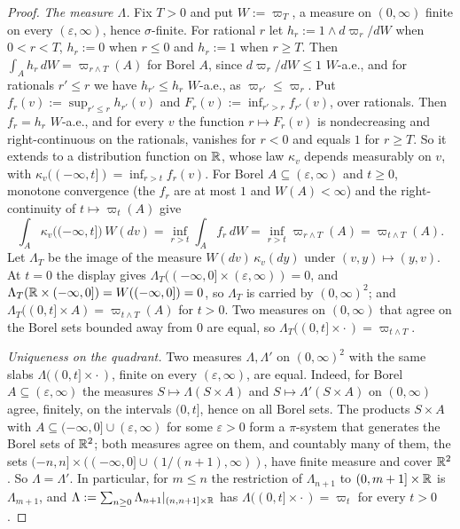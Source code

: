 \begin{proof}
\emph{The measure $\Lambda$.} Fix $T > 0$ and put $W := \varpi_T$, a measure on $(0,\infty)$
finite on every $(\varepsilon,\infty)$, hence $\sigma$-finite. For rational $r$ let
$h_r := 1 \wedge d\varpi_r/dW$ when $0 < r < T$, $h_r := 0$ when $r \le 0$ and $h_r := 1$ when
$r \ge T$. Then $\int_A h_r\,dW = \varpi_{r \wedge T}(A)$ for Borel $A$, since
$d\varpi_r/dW \le 1$ $W$-a.e., and for rationals $r' \le r$ we have $h_{r'} \le h_r$ $W$-a.e., as
$\varpi_{r'} \le \varpi_r$. Put $f_r(v) := \sup_{r' \le r}h_{r'}(v)$ and
$F_r(v) := \inf_{r' > r}f_{r'}(v)$, over rationals. Then $f_r = h_r$ $W$-a.e., and for every $v$
the function $r \mapsto F_r(v)$ is nondecreasing and right-continuous on the rationals, vanishes for
$r < 0$ and equals $1$ for $r \ge T$. So it extends to a distribution function on $\mathbb{R}$, whose
law $\kappa_v$ depends measurably on $v$, with $\kappa_v((-\infty, t]) = \inf_{r > t}f_r(v)$. For
Borel $A \subseteq (\varepsilon,\infty)$ and $t \ge 0$, monotone convergence (the $f_r$ are at most
$1$ and $W(A) < \infty$) and the right-continuity of $t \mapsto \varpi_t(A)$ give
\[
  \int_A\kappa_v\bigl((-\infty, t]\bigr)\,W(dv) = \inf_{r > t}\int_A f_r\,dW
  = \inf_{r > t}\varpi_{r \wedge T}(A) = \varpi_{t \wedge T}(A).
\]
Let $\Lambda_T$ be the image of the measure $W(dv)\,\kappa_v(dy)$ under $(v, y) \mapsto (y, v)$. At
$t = 0$ the display gives $\Lambda_T((-\infty,0] \times (\varepsilon,\infty)) = 0$, and
$\Lambda_T(\mathbb{R} \times (-\infty, 0]) = W((-\infty,0]) = 0$, so $\Lambda_T$ is carried by
$(0,\infty)^2$; and $\Lambda_T((0,t] \times A) = \varpi_{t \wedge T}(A)$ for $t > 0$. Two measures
on $(0,\infty)$ that agree on the Borel sets bounded away from $0$ are equal, so
$\Lambda_T((0,t] \times \cdot\,) = \varpi_{t \wedge T}$.

\emph{Uniqueness on the quadrant.} Two measures $\Lambda, \Lambda'$ on $(0,\infty)^2$ with the
same slabs $\Lambda((0,t] \times \cdot\,)$, finite on every $(\varepsilon,\infty)$, are equal.
Indeed, for Borel $A \subseteq (\varepsilon,\infty)$ the measures $S \mapsto \Lambda(S \times A)$
and $S \mapsto \Lambda'(S \times A)$ on $(0,\infty)$ agree, finitely, on the intervals $(0,t]$,
hence on all Borel sets. The products $S \times A$ with
$A \subseteq (-\infty,0] \cup (\varepsilon,\infty)$ for some $\varepsilon > 0$ form a
$\pi$-system that generates the Borel sets of $\mathbb{R}^2$; both measures agree on them, and countably
many of them, the sets $(-n,n] \times ((-\infty,0] \cup (1/(n+1),\infty))$, have finite measure
and cover $\mathbb{R}^2$. So $\Lambda = \Lambda'$. In particular, for $m \le n$ the restriction of
$\Lambda_{n+1}$ to $(0, m+1] \times \mathbb{R}$ is $\Lambda_{m+1}$, and
$\Lambda := \sum_{n \ge 0}\Lambda_{n+1}|_{(n, n+1] \times \mathbb{R}}$ has
$\Lambda((0,t] \times \cdot\,) = \varpi_t$ for every $t > 0$.


\end{proof}
